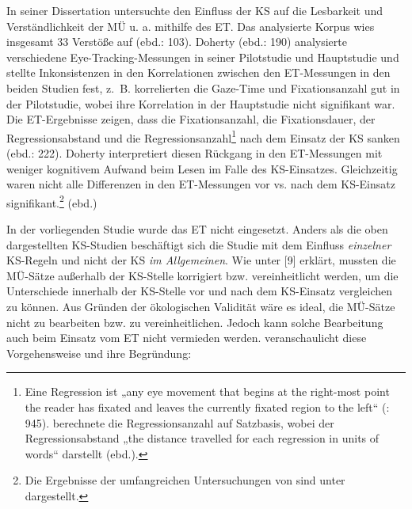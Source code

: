 In seiner Dissertation untersuchte \citet{Doherty2012} den Einfluss der KS auf die Lesbarkeit und Verständlichkeit der MÜ u. a. mithilfe des ET. Das analysierte Korpus wies insgesamt 33 Verstöße auf (ebd.: 103). Doherty (ebd.: 190) analysierte verschiedene Eye-Tracking-Messungen in seiner Pilotstudie und Hauptstudie und stellte Inkonsistenzen in den Korrelationen zwischen den ET-Messungen in den beiden Studien fest, z.~B. korrelierten die Gaze-Time und Fixationsanzahl gut in der Pilotstudie, wobei ihre Korrelation in der Hauptstudie nicht signifikant war. Die ET-Ergebnisse zeigen, dass die Fixationsanzahl, die Fixationsdauer, der Regressionsabstand und die Regressionsanzahl\footnote{\textrm{Eine Regression ist „any eye movement that begins at the right-most point the reader has fixated and leaves the currently fixated region to the left“ (\citealt{PickeringTraxler1998}: 945). \citet[114]{Doherty2012} berechnete die Regressionsanzahl auf Satzbasis, wobei der Regressionsabstand „the distance travelled for each regression in units of words“ darstellt (ebd.).} } nach dem Einsatz der KS sanken (ebd.: 222). Doherty interpretiert diesen Rückgang in den ET-Messungen mit weniger kognitivem Aufwand beim Lesen im Falle des KS-Einsatzes. Gleichzeitig waren nicht alle Differenzen in den ET-Messungen vor vs. nach dem KS-Einsatz signifikant.\footnote{\textrm{Die Ergebnisse der umfangreichen Untersuchungen von \citet{Doherty2012} sind unter  dargestellt.}} (ebd.)

In der vorliegenden Studie wurde das ET nicht eingesetzt. Anders als die oben dargestellten KS-Studien beschäftigt sich die Studie mit dem Einfluss \textit{einzelner} KS-Regeln und nicht der KS \textit{im Allgemeinen}. Wie unter  [9] erklärt, mussten die MÜ-Sätze außerhalb der KS-Stelle korrigiert bzw. vereinheitlicht werden, um die Unterschiede innerhalb der KS-Stelle vor und nach dem KS-Einsatz vergleichen zu können. Aus Gründen der ökologischen Validität wäre es ideal, die MÜ-Sätze nicht zu bearbeiten bzw. zu vereinheitlichen. Jedoch kann solche Bearbeitung auch beim Einsatz vom ET nicht vermieden werden.  veranschaulicht diese Vorgehensweise und ihre Begründung:


